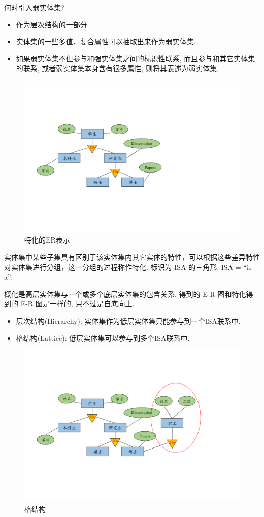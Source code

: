 \begin{remark}
    何时引入弱实体集?
    \begin{itemize}
        \item 作为层次结构的一部分.
        \item 实体集的一些多值、复合属性可以抽取出来作为弱实体集.
        \item 如果弱实体集不但参与和强实体集之间的标识性联系, 
        而且参与和其它实体集的联系, 或者弱实体集本身含有很多属性, 则将其表述为弱实体集.
    \end{itemize}
\end{remark}

\begin{figure}[H]
    \centering
    \includegraphics[width=.6\textwidth]{figure/特化.pdf}
    \caption{特化的ER表示}
\end{figure}

\begin{definition}[特化]
    实体集中某些子集具有区别于该实体集内其它实体的特性，可以根据这些差异特性对实体集进行分组，这一分组的过程称作特化. 标识为 ISA 的三角形. ISA = “is a”.
\end{definition}

\begin{definition}[概化]
    概化是高层实体集与一个或多个底层实体集的包含关系. 得到的 E-R 图和特化得到的 E-R 图是一样的, 只不过是自底向上.
\end{definition}

\begin{itemize}
    \item 层次结构(Hierarchy): 实体集作为低层实体集只能参与到一个ISA联系中.
    \item 格结构(Lattice): 低层实体集可以参与到多个ISA联系中.
\end{itemize}

\begin{figure}[H]
    \centering
    \includegraphics[width=.7\textwidth]{figure/格结构.pdf}
    \caption{格结构}
\end{figure}


